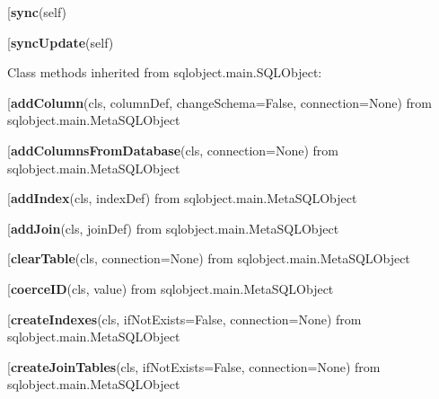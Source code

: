 \begin{description}\item[{\bf sync}(self)\end{description}

\begin{description}\item[{\bf syncUpdate}(self)\end{description}


Class methods inherited from sqlobject.main.SQLObject:\\
\begin{description}\item[{\bf addColumn}(cls, columnDef, changeSchema=False, connection=None) from sqlobject.main.MetaSQLObject\end{description}

\begin{description}\item[{\bf addColumnsFromDatabase}(cls, connection=None) from sqlobject.main.MetaSQLObject\end{description}

\begin{description}\item[{\bf addIndex}(cls, indexDef) from sqlobject.main.MetaSQLObject\end{description}

\begin{description}\item[{\bf addJoin}(cls, joinDef) from sqlobject.main.MetaSQLObject\end{description}

\begin{description}\item[{\bf clearTable}(cls, connection=None) from sqlobject.main.MetaSQLObject\end{description}

\begin{description}\item[{\bf coerceID}(cls, value) from sqlobject.main.MetaSQLObject\end{description}

\begin{description}\item[{\bf createIndexes}(cls, ifNotExists=False, connection=None) from sqlobject.main.MetaSQLObject\end{description}

\begin{description}\item[{\bf createJoinTables}(cls, ifNotExists=False, connection=None) from sqlobject.main.MetaSQLObject\end{description}


